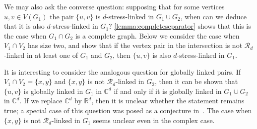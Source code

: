 \documentclass[11pt,a4paper,dvipsnames]{scrartcl}
\theoremstyle{definition}
\newcommand{\RR}{\mathbb{R}}
\newcommand{\CC}{\mathbb{C}}
\newcommand{\strongly}[1]{${#1}$-stress-linked}
\begin{document}
We may also ask the converse question: supposing that for some vertices $u,v\in V(G_1)$ the pair $\{u,v\}$ is \strongly{d} in $G_1 \cup G_2$, when can we deduce that it is also \strongly{d} in $G_1$? \cref{lemma:completeseparator} shows that this is the case when $G_1 \cap G_2$ is a complete graph. Below we consider the case when $V_1 \cap V_2$ has size two, and show that if the vertex pair in the intersection is not $\mathcal{R}_d$-linked in at least one of $G_1$ and $G_2$, then $\{u,v\}$ is also \strongly{d} in $G_1$.

It is interesting to consider the analogous question for globally linked pairs. If $V_1 \cap V_2 = \{x,y\}$ and $\{x,y\}$ is not $\mathcal{R}_d$-linked in $G_2$, then it can be shown that $\{u,v\}$ is globally linked in $G_1$ in $\CC^d$ if and only if it is globally linked in $G_1 \cup G_2$ in $\CC^d$. If we replace $\CC^d$ by $\RR^d$, then it is unclear whether the statement remains true; a special case of this question was posed as a conjecture in~\cite[Conjecture 5.7]{garamvolgyi.jordan_2023a}. The case when $\{x,y\}$ is not $\mathcal{R}_d$-linked in $G_1$ seems unclear even in the complex case.
\end{document}
